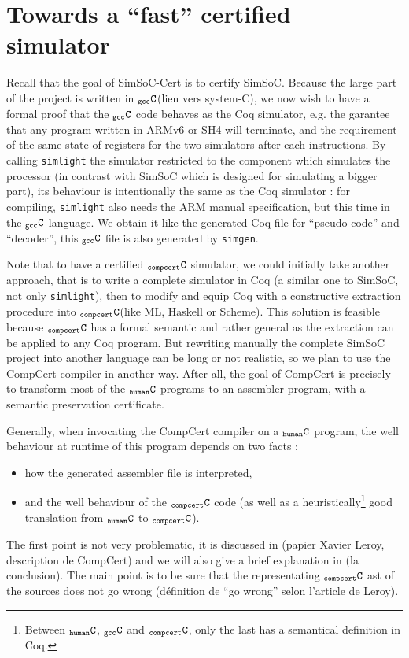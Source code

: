 \documentclass[a4paper, 11pt]{article}
\newcommand{\simlight}{{\tt simlight}\xspace}
\newcommand{\simgen}{{\tt simgen}\xspace}
\newcommand{\C}{$_{\tt compcert}{\tt C}$\xspace}
\newcommand{\gccC}{$_{\tt gcc}{\tt C}$\xspace}
\newcommand{\hC}{$_{\tt human}{\tt C}$\xspace}
\begin{document}
\section{Towards a ``fast'' certified simulator}
Recall that the goal of SimSoC-Cert is to certify SimSoC. Because the large part of the project is written in \gccC (lien vers system-C), we now wish to have a formal proof that the \gccC code behaves as the Coq simulator, e.g. the garantee that any program written in ARMv6 or SH4 will terminate, and the requirement of the same state of registers for the two simulators after each instructions. By calling \simlight the simulator restricted to the component which simulates the processor (in contrast with SimSoC which is designed for simulating a bigger part), its behaviour is intentionally the same as the Coq simulator : for compiling, \simlight also needs the ARM manual specification, but this time in the \gccC language. We obtain it like the generated Coq file for ``pseudo-code'' and ``decoder'', this \gccC file is also generated by \simgen.

Note that to have a certified \C simulator, we could initially take another approach, that is to write a complete simulator in Coq (a similar one to SimSoC, not only \simlight), then to modify and equip Coq with a constructive extraction procedure into \C (like ML, Haskell or Scheme). This solution is feasible because \C has a formal semantic and rather general as the extraction can be applied to any Coq program. But rewriting manually the complete SimSoC project into another language can be long or not realistic, so we plan to use the CompCert compiler in another way. After all, the goal of CompCert is precisely to transform most of the \hC programs to an assembler program, with a semantic preservation certificate. 

Generally, when invocating the CompCert compiler on a \hC program, the well behaviour at runtime of this program depends on two facts :
\begin{itemize}
\item how the generated assembler file is interpreted,
\item and the well behaviour of the \C code (as well as a heuristically\footnote{Between \hC, \gccC and \C, only the last has a semantical definition in Coq.} good translation from \hC to \C).
\end{itemize}
The first point is not very problematic, it is discussed in (papier Xavier Leroy, description de CompCert) and we will also give a brief explanation in (la conclusion).
The main point is to be sure that the representating \C ast of the sources does not go wrong (définition de ``go wrong'' selon l'article de Leroy).
\end{document}
